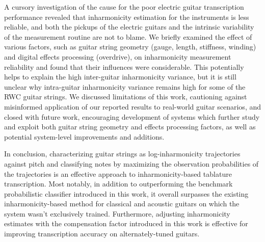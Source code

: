 \documentclass[convention,peer-reviewed]{aesconf}
\begin{document}
A cursory investigation of the cause for the poor electric guitar transcription performance revealed that inharmonicity estimation for the instruments is less reliable, and both the pickups of the electric guitars and the intrinsic variability of the measurement routine are not to blame. We briefly examined the effect of various factors, such as guitar string geometry (gauge, length, stiffness, winding) and digital effects processing (overdrive), on inharmonicity measurement reliability and found that their influences were considerable. This potentially helps to explain the high inter-guitar inharmonicity variance, but it is still unclear why intra-guitar inharmonicity variance remains high for some of the RWC guitar strings. We discussed limitations of this work, cautioning against misinformed application of our reported results to real-world guitar scenarios, and closed with future work, encouraging development of systems which further study and exploit both guitar string geometry and effects processing factors, as well as potential system-level improvements and additions.

In conclusion, characterizing guitar strings as log-inharmonicity trajectories against pitch and classifying notes by maximizing the observation probabilities of the trajectories is an effective approach to inharmonicity-based tablature transcription. Most notably, in addition to outperforming the benchmark probabilistic classifier introduced in this work, it overall surpasses the existing inharmonicity-based method for classical and acoustic guitars on which the system wasn't exclusively trained. Furthermore, adjusting inharmonicity estimates with the compensation factor introduced in this work is effective for improving transcription accuracy on alternately-tuned guitars.





\end{document}
